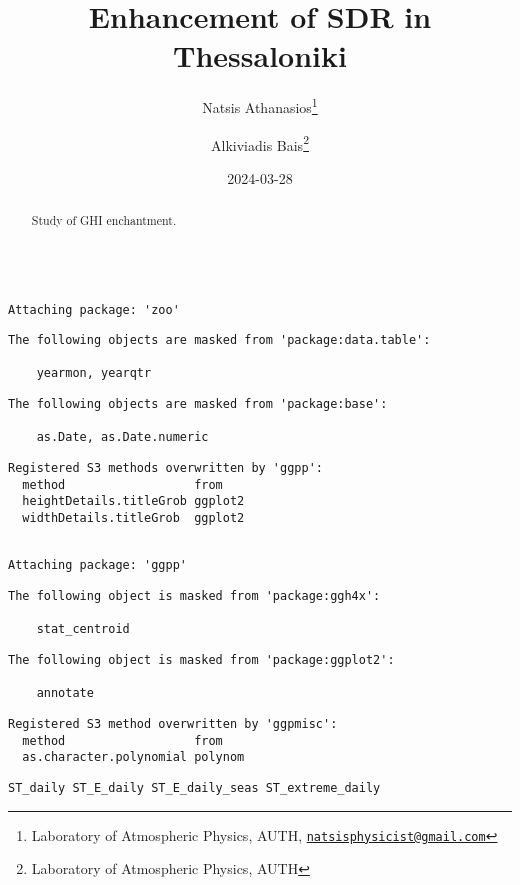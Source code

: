 \documentclass[
  10pt,
  a4paper,oneside]{article}
\title{Enhancement of SDR in Thessaloniki}
\author{Natsis Athanasios\footnote{Laboratory of Atmospheric Physics, AUTH, \href{mailto:natsisphysicist@gmail.com}{\nolinkurl{natsisphysicist@gmail.com}}} \and Alkiviadis Bais\footnote{Laboratory of Atmospheric Physics, AUTH}}
\date{2024-03-28}
\begin{document}
\maketitle
\begin{abstract}
Study of GHI enchantment.
\end{abstract}

{
\hypersetup{linkcolor=}
\setcounter{tocdepth}{4}
\tableofcontents
}
\begin{verbatim}

Attaching package: 'zoo'
\end{verbatim}

\begin{verbatim}
The following objects are masked from 'package:data.table':

    yearmon, yearqtr
\end{verbatim}

\begin{verbatim}
The following objects are masked from 'package:base':

    as.Date, as.Date.numeric
\end{verbatim}

\begin{verbatim}
Registered S3 methods overwritten by 'ggpp':
  method                  from   
  heightDetails.titleGrob ggplot2
  widthDetails.titleGrob  ggplot2
\end{verbatim}

\begin{verbatim}

Attaching package: 'ggpp'
\end{verbatim}

\begin{verbatim}
The following object is masked from 'package:ggh4x':

    stat_centroid
\end{verbatim}

\begin{verbatim}
The following object is masked from 'package:ggplot2':

    annotate
\end{verbatim}

\begin{verbatim}
Registered S3 method overwritten by 'ggpmisc':
  method                  from   
  as.character.polynomial polynom
\end{verbatim}

\begin{verbatim}
ST_daily ST_E_daily ST_E_daily_seas ST_extreme_daily
\end{verbatim}
\end{document}
